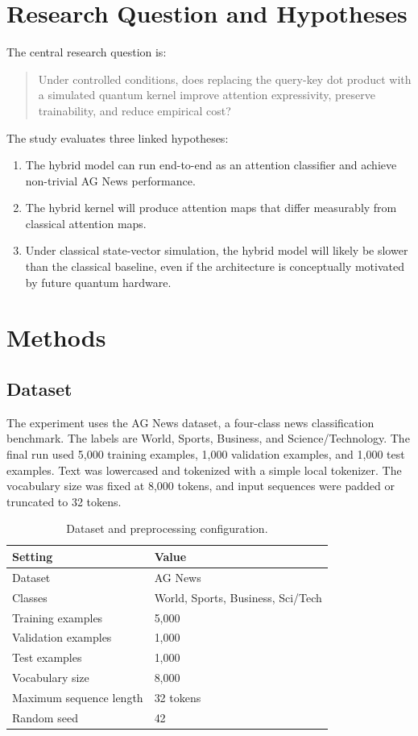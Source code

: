 \documentclass[11pt]{article}
\begin{document}
\section{Research Question and Hypotheses}
The central research question is:
\begin{quote}
Under controlled conditions, does replacing the query-key dot product with a simulated quantum kernel improve attention expressivity, preserve trainability, and reduce empirical cost?
\end{quote}

The study evaluates three linked hypotheses:
\begin{enumerate}[label=\textbf{H\arabic*:},leftmargin=0.75in]
    \item The hybrid model can run end-to-end as an attention classifier and achieve non-trivial AG News performance.
    \item The hybrid kernel will produce attention maps that differ measurably from classical attention maps.
    \item Under classical state-vector simulation, the hybrid model will likely be slower than the classical baseline, even if the architecture is conceptually motivated by future quantum hardware.
\end{enumerate}

\section{Methods}
\subsection{Dataset}
The experiment uses the AG News dataset, a four-class news classification benchmark. The labels are World, Sports, Business, and Science/Technology. The final run used 5,000 training examples, 1,000 validation examples, and 1,000 test examples. Text was lowercased and tokenized with a simple local tokenizer. The vocabulary size was fixed at 8,000 tokens, and input sequences were padded or truncated to 32 tokens.

\begin{table}[H]
\centering
\caption{Dataset and preprocessing configuration.}
\begin{tabular}{ll}
\toprule
Setting & Value\\
\midrule
Dataset & AG News\\
Classes & World, Sports, Business, Sci/Tech\\
Training examples & 5,000\\
Validation examples & 1,000\\
Test examples & 1,000\\
Vocabulary size & 8,000\\
Maximum sequence length & 32 tokens\\
Random seed & 42\\
\bottomrule
\end{tabular}
\end{table}
\end{document}
